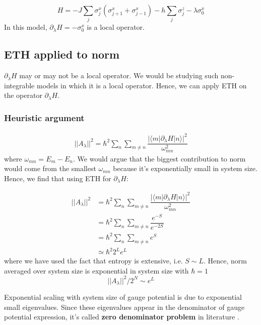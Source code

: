 \documentclass[11pt,a4paper]{article}
\begin{document}
\begin{equation}
H= -J \sum_{j} \sigma_j^x (\sigma_{j+1}^x+ \sigma_{j-1}^x) - h\sum_{j} \sigma_j^z -\lambda  \sigma_0^x 
\end{equation}
In this model, $\partial_{\lambda}H = -  \sigma_0^x  $ is a local operator.


\subsection{ETH applied to norm}
$\partial_{\lambda}H$ may or may not be a local operator. We would be studying such non-integrable models in which it is a local operator. Hence, we can apply ETH on the operator $\partial_{\lambda}H$.

\subsubsection{Heuristic argument}
\begin{align*}
||A_{\lambda}||^2= \hbar^2\sum_n \sum_{m \neq n}  \dfrac{|\langle m | \partial_{\lambda}H| n \rangle|^2}{\omega_{mn}^2}
\end{align*}
where $\omega_{mn}= E_m-E_n$.
We would argue that the biggest contribution to norm would come from the smallest $\omega_{mn}$ because it's exponentially small in system size. Hence, we find that using ETH for  $\partial_{\lambda}H$:

\begin{align*}
||A_{\lambda}||^2&= \hbar^2\sum_n \sum_{m \neq n}  \dfrac{|\langle m | \partial_{\lambda}H| n \rangle|^2}{\omega_{mn}^2}\\
&= \hbar^2\sum_n \sum_{m \neq n}  \dfrac{ e^{-S}}{e^{-2S}} \\
&= \hbar^2\sum_n \sum_{m \neq n}  e^{S} \\
& \simeq \hbar^2 2^L  e^{L} 
\end{align*}
where we have used the fact that entropy is extensive, i.e. $S \sim L$. Hence, norm averaged over system size is exponential in system size with $\hbar=1$
\begin{equation}
\boxed{||A_{\lambda}||^2/ 2^N \sim  e^{L} 
}
\end{equation}

Exponential scaling with system size of gauge potential is due to exponential small eigenvalues. Since these eigenvalues appear in the denominator of gauge potential expression, it's called \textbf{zero denominator problem} in literature \cite{kolodrubetz2016geometry}. 
\end{document}
